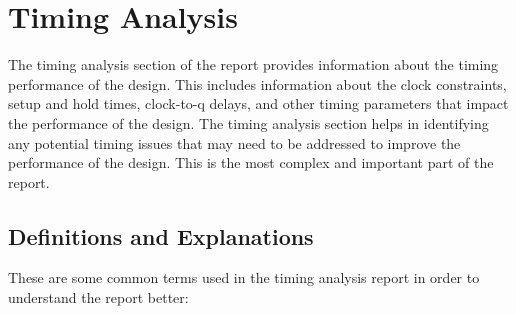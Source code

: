 \documentclass{report}
\begin{document}
\chapter{Timing Analysis}
The timing analysis section of the report provides information about the timing performance of the design. This includes information about the clock constraints, setup and hold times, clock-to-q delays, and other timing parameters that impact the performance of the design. The timing analysis section helps in identifying any potential timing issues that may need to be addressed to improve the performance of the design. This is the most complex and important part of the report.
\section{Definitions and Explanations}
These are some common terms used in the timing analysis report in order to understand the report better:
\end{document}
